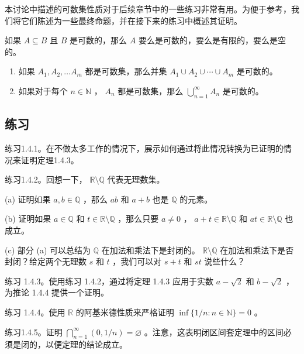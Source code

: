本讨论中描述的可数集性质对于后续章节中的一些练习非常有用。为便于参考，我们将它们陈述为一些最终命题，并在接下来的练习中概述其证明。

\begin{Thm}
  \label{thm:1.4.12}
  如果 \(A \subseteq  B\) 且 \(B\) 是可数的，那么 \(A\) 要么是可数的，要么是有限的，要么是空的。
\end{Thm}


\begin{Thm}
  \label{thm:1.4.13}
  \begin{enumerate}[label = (\roman*)]
  \item 如果 \({A}_{1},{A}_{2},\ldots {A}_{m}\) 都是可数集，那么并集 \({A}_{1} \cup  {A}_{2} \cup  \cdots  \cup  {A}_{m}\) 是可数的。
  \item 如果对于每个 \(n \in  \mathbb{N}\) ， \({A}_{n}\) 都是可数集，那么 \(\mathop{\bigcup }\limits_{{n = 1}}^{\infty }{A}_{n}\) 是可数的。
  \end{enumerate}
\end{Thm}


\subsection{练习}

练习1.4.1。在不做太多工作的情况下，展示如何通过将此情况转换为已证明的情况来证明定理1.4.3。

练习1.4.2。回想一下， \(\mathbb{R}\setminus\mathbb{Q}\) 代表无理数集。

(a) 证明如果 \(a,b \in  \mathbb{Q}\) ，那么 \({ab}\) 和 \(a + b\) 也是 \(\mathbb{Q}\) 的元素。

(b) 证明如果 \(a \in  \mathbb{Q}\) 和 \(t \in  \mathbb{R}\setminus\mathbb{Q}\) ，那么只要 \(a \neq  0\) ， \(a + t \in  \mathbb{R}\setminus\mathbb{Q}\) 和 \({at} \in  \mathbb{R}\setminus\mathbb{Q}\) 也成立。

(c) 部分 (a) 可以总结为 \(\mathbb{Q}\) 在加法和乘法下是封闭的。 \(\mathbb{R}\setminus\mathbb{Q}\) 在加法和乘法下是否封闭？给定两个无理数 \(s\) 和 \(t\) ，我们可以对 \(s + t\) 和 \({st}\) 说些什么？

练习 1.4.3。使用练习 1.4.2，通过将定理 1.4.3 应用于实数 \(a - \sqrt{2}\) 和 \(b - \sqrt{2}\) ，为推论 1.4.4 提供一个证明。

练习 1.4.4。使用 \(\mathbb{R}\) 的阿基米德性质来严格证明 \(\inf \{ 1/n : n \in  \mathbb{N}\}  = 0\) 。

练习1.4.5。证明 \(\mathop{\bigcap }\limits_{{n = 1}}^{\infty }\left( {0,1/n}\right)  = \varnothing\) 。注意，这表明闭区间套定理中的区间必须是闭的，以便定理的结论成立。

